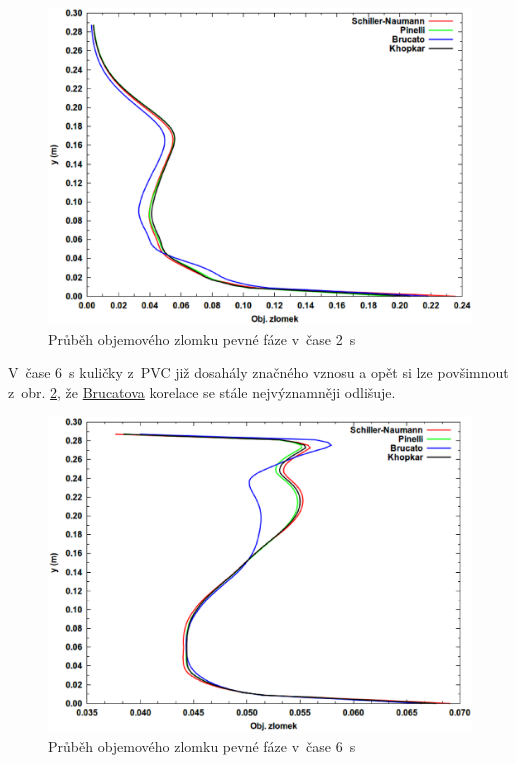 \begin{figure}[h!]
\begin{center}
\includegraphics[scale=0.47]{images/Vol-2.eps}
\caption{Průběh objemového zlomku pevné fáze v~čase \SI{2}{\second}}
\label{fig:vol2}
\end{center}
\end{figure} 

\vspace{-9mm}

\noindent V~čase \SI{6}{\second} kuličky z~PVC již dosahály značného vznosu a opět si lze povšimnout z~obr. \ref{fig:vol6}, že \hyperlink{hyp:cds}{Brucatova} korelace se stále nejvýznamněji odlišuje.  

\begin{figure}[h!]
\begin{center}
\includegraphics[scale=0.47]{images/Vol-6.eps}
\caption{Průběh objemového zlomku pevné fáze v~čase \SI{6}{\second}}
\label{fig:vol6}
\end{center}
\end{figure} 

